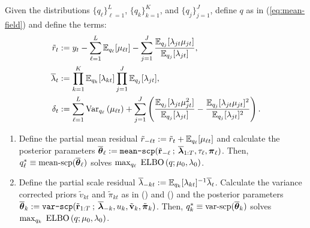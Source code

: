 \begin{proposition} 
\label{prop:1}
Given the distributions $\{q_\ell\}_{\ell=1}^L$, $\{q_k\}_{k=1}^K$, and $\{q_j\}_{j=1}^J$, define $q$ as in (\ref{eq:mean-field}) and define the terms: 
\small
\begin{align}
    \tilde{r}_t &:= y_t - \sum_{\ell = 1}^L \mathbb{E}_{q_\ell}[\mu_{\ell t}] - \sum_{j = 1}^J \frac{\mathbb{E}_{q_j}[\lambda_{jt} \mu_{jt}]}{\mathbb{E}_{q_j}[\lambda_{jt}]}, \label{eq:mod-resid} \\
    \overline{\lambda}_t &:= \prod_{k=1}^K \mathbb{E}_{q_k}[\lambda_{kt}] \prod_{j=1}^J \mathbb{E}_{q_j}[\lambda_{jt}], \label{eq:lambda-bar} \\
    \delta_t &:= \sum_{\ell=1}^L \text{\normalfont Var}_{q_\ell}\left(\mu_{\ell t} \right) +  \sum_{j=1}^J\left(\frac{\mathbb{E}_{q_j}[\lambda_{jt} \mu^2_{jt}]}{\mathbb{E}_{q_j}[\lambda_{jt}]} -\frac{\mathbb{E}_{q_j}[\lambda_{jt} \mu_{jt}]^2}{\mathbb{E}_{q_j}[\lambda_{jt}]^2} \right). \label{eq:delta}
\end{align}
\normalsize
\begin{enumerate}[label=\roman*.]
    \item Define the partial mean residual $\tilde{r}_{-\ell t} :=  \tilde{r}_{t} + \mathbb{E}_{q_{\ell}}[\mu_{\ell t}]$ and calculate the posterior parameters $\overline{\boldsymbol{\theta}}_\ell := \normalfont{\texttt{mean-scp}}(\tilde{\mathbf{r}}_{-\ell} \:;\: \overline{\boldsymbol{\lambda}}_{1:T}, \tau_{\ell}, \boldsymbol{\pi}_{\ell})$. Then, $q^*_\ell \equiv \text{\normalfont mean-scp}(\overline{\boldsymbol{\theta}}_\ell)$ solves $\max_{q_\ell} \; \text{\normalfont ELBO}\left(q;\mu_0,\lambda_0\right)$.
    \vspace{-5pt}
    
    \item Define the partial scale residual $\overline{\lambda}_{-kt} :=  \mathbb{E}_{q_k}[\lambda_{k t}]^{-1}\overline{\lambda}_t$. Calculate the variance corrected priors $\tilde{v}_{kt}$ and $\tilde{\pi}_{kt}$ as in () and () and the posterior parameters $\overline{\boldsymbol{\theta}}_k := \normalfont{\texttt{var-scp}}(\tilde{\mathbf{r}}_{1:T} \:;\:\overline{\boldsymbol{\lambda}}_{-k}, u_k, \tilde{\mathbf{v}}_{k}, \tilde{\boldsymbol{\pi}}_k)$.  Then, $q^*_k \equiv \text{\normalfont var-scp}(\overline{\boldsymbol{\theta}}_k)$ solves $\max_{q_k}  \; \text{\normalfont ELBO}\left(q;\mu_0,\lambda_0\right)$.
    \vspace{-5pt}


\end{enumerate}
\end{proposition}
